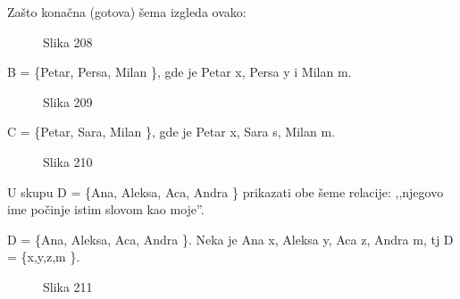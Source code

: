     Za\v sto kona\v cna (gotova) \v sema izgleda ovako:



    \begin{figure}[H] 

        \center


        \caption{Slika 208}

        \label{Slika208}

    \end{figure}



    B = \{Petar, Persa, Milan \}, gde je Petar x, Persa y i Milan m.



    \begin{figure}[H] 

        \center


        \caption{Slika 209}

        \label{Slika209}

    \end{figure}



    C = \{Petar, Sara, Milan \}, gde je Petar x, Sara s, Milan m.



    \begin{figure}[H] 

        \center


        \caption{Slika 210}

        \label{Slika210}

    \end{figure}



    \begin{zad}

        U skupu D = \{Ana, Aleksa, Aca, Andra \} prikazati obe \v seme relacije: ,,njegovo ime po\v cinje istim slovom kao moje''.

    \end{zad}



    D = \{Ana, Aleksa, Aca, Andra \}. Neka je Ana x, Aleksa y, Aca z, Andra m, tj D = \{x,y,z,m \}.



    \begin{figure}[H] 

        \center


        \caption{Slika 211}

        \label{Slika211}

    \end{figure}

    

